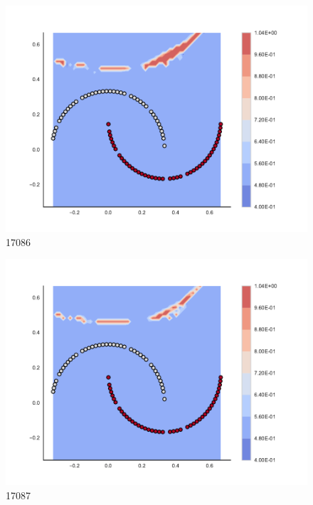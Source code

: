 \begin{subfigure}[b]{0.09\textwidth}
    \includegraphics[clip, trim=2.35cm 1.75cm 4.5cm 0cm,width=\textwidth]{img/convergence/17086.pdf}
    \caption{17086}
    \label{fig:convergence_17086}
\end{subfigure}
%
\begin{subfigure}[b]{0.09\textwidth}
    \includegraphics[clip, trim=2.35cm 1.75cm 4.5cm 0cm,width=\textwidth]{img/convergence/17087.pdf}
    \caption{17087}
    \label{fig:convergence_17087}
\end{subfigure}
%
